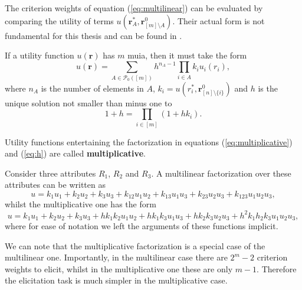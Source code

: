 The criterion weights of equation (\ref{eq:multilinear}) can be evaluated by comparing the utility of terms $u(\bm{r}_A^*,\bm{r}_{[m]\setminus A}^0)$. Their actual form is not fundamental for this thesis and can be found in \citet{Keeney1993a}. 

\begin{proposition}
\label{prop:multiplicative}
If a utility function $u(\bm{r})$ has $m$ \gls{muia}, then it must take the form
\begin{equation}
\label{eq:multiplicative}
u(\bm{r})=\sum_{A\in\mathcal{P}_0([m])}h^{n_A-1}\prod_{i\in A}k_iu_i(r_i),
\end{equation}
where $n_A$ is the number of elements in $A$, $k_i=u\left(r_i^*,\bm{r}_{[n]\setminus \{i\}}^0\right)$ and $h$ is the unique solution not smaller than minus one to
\begin{equation}
\label{eq:h}
1+h=\prod_{i\in[m]}(1+hk_i).
\end{equation}
\end{proposition}

\begin{definition}
\label{def:multiplicative}
Utility functions entertaining the factorization in equations (\ref{eq:multiplicative}) and (\ref{eq:h}) are called \textbf{multiplicative}.
\end{definition}

\begin{example}
Consider three attributes $R_1$, $R_2$ and $R_3$. A multilinear factorization over these attributes can be written as
\begin{equation*}
u=k_1u_1+k_2u_2+k_3u_3+k_{12}u_1u_2+k_{13}u_1u_3+k_{23}u_{2}u_3+k_{123}u_1u_2u_3,
\end{equation*}
whilst the multiplicative one has the form
\begin{equation}
\label{eq:examplemultilinear}
u=k_1u_1+k_2u_2+k_3u_3+hk_{1}k_{2}u_1u_2+hk_{1}k_{3}u_1u_3+hk_{2}k_{3}u_{2}u_3+h^2k_{1}h_{2}k_{3}u_1u_2u_3,
\end{equation}
where for ease of notation we left the arguments of these functions implicit.
\end{example}
We can note that the multiplicative factorization is a special case of the multilinear one.  Importantly, in the multilinear case there are $2^m-2$ criterion weights to elicit, whilst in the multiplicative one these are only $m-1$. Therefore the elicitation task is much simpler in the multiplicative case. 

